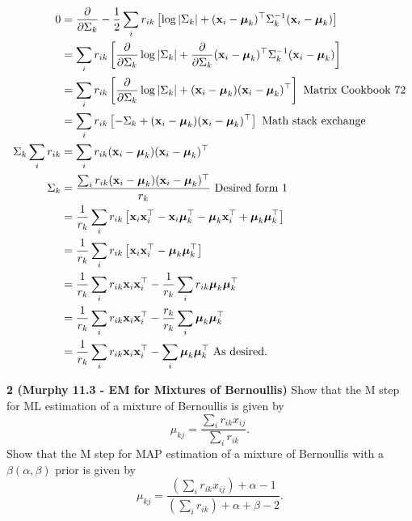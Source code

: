 \documentclass[12pt,letterpaper,fleqn]{hmcpset}
\begin{document}
\begin{align*}
    0 &= \frac{\partial}{\partial \Sigma_k} -\frac{1}{2} \sum_i r_{ik} \left[ \log|\Sigma_k| + ({\bf x}_i - \hbox{\boldmath$\mu$}_k)^\top \Sigma_k^{-1} ({\bf x}_i - \hbox{\boldmath$\mu$}_k) \right]\\
    &= \sum_i r_{ik} \left[ \frac{\partial}{\partial \Sigma_k} \log|\Sigma_k| + \frac{\partial}{\partial \Sigma_k}({\bf x}_i - \hbox{\boldmath$\mu$}_k)^\top \Sigma_k^{-1} ({\bf x}_i - \hbox{\boldmath$\mu$}_k) \right] \\
    &= \sum_i r_{ik} \left[ \frac{\partial}{\partial \Sigma_k} \log|\Sigma_k| + ({\bf x}_i - \hbox{\boldmath$\mu$}_k) ({\bf x}_i - \hbox{\boldmath$\mu$}_k)^\top \right] \text{ Matrix Cookbook 72} \\
    &= \sum_i r_{ik} \left[ -\Sigma_k + ({\bf x}_i - \hbox{\boldmath$\mu$}_k) ({\bf x}_i - \hbox{\boldmath$\mu$}_k)^\top \right] \text{ Math stack exchange} \\
    \Sigma_k \sum_i r_{ik} &= \sum_i r_{ik} ({\bf x}_i - \hbox{\boldmath$\mu$}_k) ({\bf x}_i - \hbox{\boldmath$\mu$}_k)^\top\\
    \Sigma_k &= \frac{ \sum_i r_{ik} ({\bf x}_i - \hbox{\boldmath$\mu$}_k) ({\bf x}_i - \hbox{\boldmath$\mu$}_k)^\top}{r_k} \text{ Desired form 1}\\
    &= \frac{1}{r_k} \sum_i r_{ik} \left[{\bf x}_i{\bf x}_i^\top  - {\bf x}_i \hbox{\boldmath$\mu$}_k ^\top - \hbox{\boldmath$\mu$}_k {\bf x}_i^\top + \hbox{\boldmath$\mu$}_k\hbox{\boldmath$\mu$}_k^\top \right] \\
    &= \frac{1}{r_k} \sum_i r_{ik} \left[{\bf x}_i{\bf x}_i^\top - \hbox{\boldmath$\mu$}_k\hbox{\boldmath$\mu$}_k^\top \right] \\
    &= \frac{1}{r_k} \sum_i r_{ik} {\bf x}_i{\bf x}_i^\top - \frac{1}{r_k} \sum_i r_{ik} \hbox{\boldmath$\mu$}_k\hbox{\boldmath$\mu$}_k^\top \\
    &= \frac{1}{r_k} \sum_i r_{ik} {\bf x}_i{\bf x}_i^\top - \frac{r_k}{r_k} \sum_i \hbox{\boldmath$\mu$}_k\hbox{\boldmath$\mu$}_k^\top \\
    &= \frac{1}{r_k} \sum_i r_{ik} {\bf x}_i{\bf x}_i^\top -  \sum_i \hbox{\boldmath$\mu$}_k\hbox{\boldmath$\mu$}_k^\top \text{ As desired.}
    \end{align*}

\newpage


\textbf{2 (Murphy 11.3 - EM for Mixtures of Bernoullis)} Show that the M step for ML estimation
of a mixture of Bernoullis is given by
\[
    \mu_{kj} = \frac{\sum_i r_{ik}x_{ij}}{\sum_i r_{ik}}.
\]
Show that the M step for MAP estimation of a mixture of Bernoullis with a $\beta(\alpha,\beta)$ prior
is given by
\[
    \mu_{kj} = \frac{\left(\sum_i r_{ik}x_{ij}\right) + \alpha - 1}{\left(\sum_i r_{ik}\right) + \alpha + \beta - 2}.
\]
\end{document}
